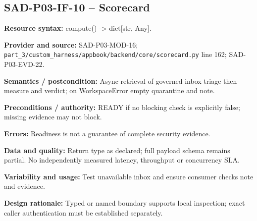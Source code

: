 \documentclass[10pt,letterpaper]{article}
\begin{document}
\subsection{SAD-P03-IF-10 -- Scorecard}
{\raggedright \textbf{Resource syntax:} compute(\allowbreak{}) -> dict[str, Any].\par}
\textbf{Provider and source:} SAD-P03-MOD-16; \nolinkurl{part_3/custom_harness/appbook/backend/core/scorecard.py} line 162; SAD-P03-EVD-22.\par
\textbf{Semantics / postcondition:} Async retrieval of governed inbox triage then measure and verdict; on WorkspaceError empty quarantine and note.\par
\textbf{Preconditions / authority:} READY if no blocking check is explicitly false; missing evidence may not block.\par
\textbf{Errors:} Readiness is not a guarantee of complete security evidence.\par
\textbf{Data and quality:} Return type as declared; full payload schema remains partial. No independently measured latency, throughput or concurrency SLA.\par
\textbf{Variability and usage:} Test unavailable inbox and ensure consumer checks note and evidence.\par
\textbf{Design rationale:} Typed or named boundary supports local inspection; exact caller authentication must be established separately.\par
\end{document}
